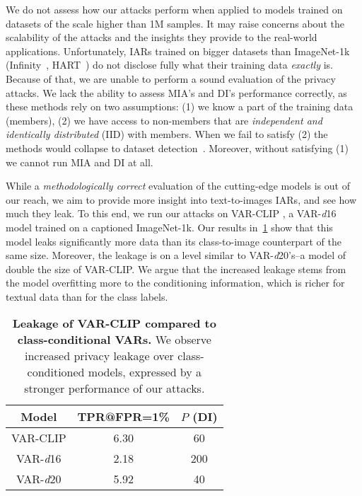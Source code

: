 {We do not assess how our attacks perform when applied to models trained on datasets of the scale higher than 1M samples. It may raise concerns about the scalability of the attacks and the insights they provide to the real-world applications. Unfortunately, IARs trained on bigger datasets than ImageNet-1k (Infinity~\citep{han2024infinityscalingbitwiseautoregressive}, HART~\citep{tang2024hartefficientvisualgeneration}) do not disclose fully what their training data \textit{exactly} is. Because of that, we are unable to perform a sound evaluation of the privacy attacks. We lack the ability to assess MIA's and DI's performance correctly, as these methods rely on two assumptions: (1) we know a part of the training data (members), (2) we have access to non-members that are \textit{independent and identically distributed} (IID) with members. When we fail to satisfy (2) the methods would collapse to dataset detection~\citep{das2024blind}. Moreover, without satisfying (1) we cannot run MIA and DI at all.}

{While a \textit{methodologically correct} evaluation of the cutting-edge models is out of our reach, we aim to provide more insight into text-to-images IARs, and see how much they leak. To this end, we run our attacks on VAR-CLIP \citep{zhang2024varcliptexttoimagegeneratorvisual}, a VAR-\textit{d}16 model trained on a captioned ImageNet-1k. Our results in~\cref{tab:varclip} show that this model leaks significantly more data than its class-to-image counterpart of the same size. Moreover, the leakage is on a level similar to VAR-\textit{d}20's--a model of double the size of VAR-CLIP. We argue that the increased leakage stems from the model overfitting more to the conditioning information, which is richer for textual data than for the class labels.}

\begin{table}[h]
    \centering
    \scriptsize
    \caption{{\textbf{Leakage of VAR-CLIP compared to class-conditional VARs.} We observe increased privacy leakage over class-conditioned models, expressed by a stronger performance of our attacks.}}
    \begin{tabular}{ccc}
    \toprule
        \textbf{Model} & \textbf{TPR@FPR=1\%} & \textbf{$P$ (DI)} \\ 
        \midrule
         {VAR-CLIP} & 6.30 & 60 \\ 
         {VAR-\textit{d}16} & 2.18 & 200 \\ 
         {VAR-\textit{d}20} & 5.92 & 40 \\ 
        \bottomrule
    \end{tabular}
    \label{tab:varclip}
\end{table}

